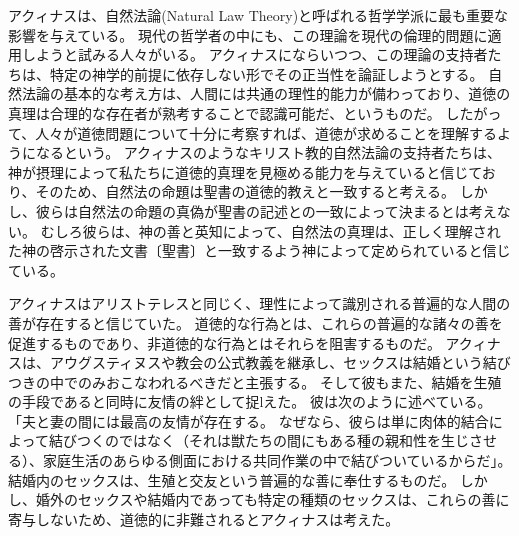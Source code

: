 \documentclass[paper=a4,book,openany]{jlreq}
\begin{document}
アクィナスは、自然法論(Natural Law Theory)と呼ばれる哲学学派に最も重要な影響を与えている。
現代の哲学者の中にも、この理論を現代の倫理的問題に適用しようと試みる人々がいる。
アクィナスにならいつつ、この理論の支持者たちは、特定の神学的前提に依存しない形でその正当性を論証しようとする。
自然法論の基本的な考え方は、人間には共通の理性的能力が備わっており、道徳の真理は合理的な存在者が熟考することで認識可能だ、というものだ。
したがって、人々が道徳問題について十分に考察すれば、道徳が求めることを理解するようになるという。
アクィナスのようなキリスト教的自然法論の支持者たちは、神が摂理によって私たちに道徳的真理を見極める能力を与えていると信じており、そのため、自然法の命題は聖書の道徳的教えと一致すると考える。
しかし、彼らは自然法の命題の真偽が聖書の記述との一致によって決まるとは考えない。
むしろ彼らは、神の善と英知によって、自然法の真理は、正しく理解された神の啓示された文書〔聖書〕と一致するよう神によって定められていると信じている。

アクィナスはアリストテレスと同じく、理性によって識別される普遍的な人間の善が存在すると信じていた。
道徳的な行為とは、これらの普遍的な諸々の善を促進するものであり、非道徳的な行為とはそれらを阻害するものだ。
アクィナスは、アウグスティヌスや教会の公式教義を継承し、セックスは結婚という結びつきの中でのみおこなわれるべきだと主張する。
そして彼もまた、結婚を生殖の手段であると同時に友情の絆として捉lえた。
彼は次のように述べている。
「夫と妻の間には最高の友情が存在する。
なぜなら、彼らは単に肉体的結合によって結びつくのではなく（それは獣たちの間にもある種の親和性を生じさせる）、家庭生活のあらゆる側面における共同作業の中で結びついているからだ」\citep[Bk.3 Pt. 2 Chap. 123]{aquinas55:_summa_gentil}。
結婚内のセックスは、生殖と交友という普遍的な善に奉仕するものだ。
しかし、婚外のセックスや結婚内であっても特定の種類のセックスは、これらの善に寄与しないため、道徳的に非難されるとアクィナスは考えた。
\end{document}
